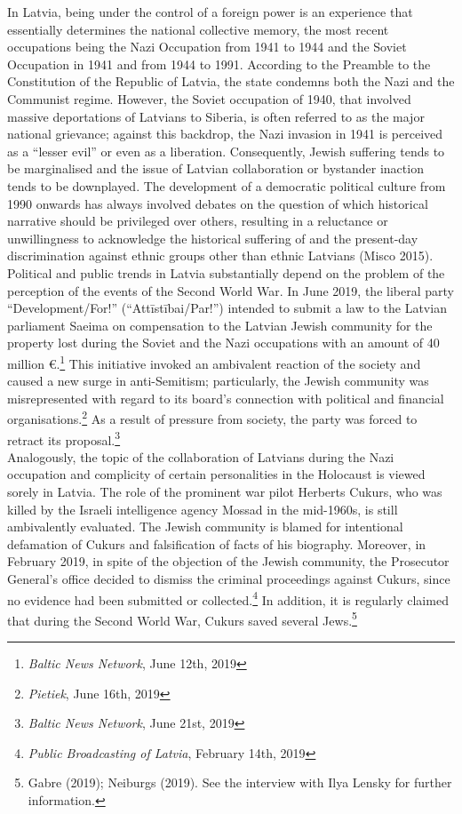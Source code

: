 In Latvia, being under the control of a foreign power is an experience that essentially determines the national collective memory, the most recent occupations being the Nazi Occupation from 1941 to 1944 and the Soviet Occupation in 1941 and from 1944 to 1991. According to the Preamble to the Constitution of the Republic of Latvia, the state condemns both the Nazi and the Communist regime. However, the Soviet occupation of 1940, that involved massive deportations of Latvians to Siberia, is often referred to as the major national grievance; against this backdrop, the Nazi invasion in 1941 is perceived as a “lesser evil” or even as a liberation. Consequently, Jewish suffering tends to be marginalised and the issue of Latvian collaboration or bystander inaction tends to be downplayed. The development of a democratic political culture from 1990 onwards has always involved debates on the question of which historical narrative should be privileged over others, resulting in a reluctance or unwillingness to acknowledge the historical suffering of and the present-day discrimination against ethnic groups other than ethnic Latvians (Misco 2015). \\
Political and public trends in Latvia substantially depend on the problem of the perception of the events of the Second World War. In June 2019, the liberal party ``Development/For!'' (``Attīstībai/Par!'') intended to submit a law to the Latvian parliament Saeima on compensation to the Latvian Jewish community for the property lost during the Soviet and the Nazi occupations with an amount of 40 million \euro{}.\footnote{\textit{Baltic News Network}, June 12th, 2019} This initiative invoked an ambivalent reaction of the society and caused a new surge in anti-Semitism; particularly, the Jewish community was misrepresented with regard to its board’s connection with political and financial organisations.\footnote{\textit{Pietiek}, June 16th, 2019} As a result of pressure from society, the party was forced to retract its proposal.\footnote{\textit{Baltic News Network}, June 21st, 2019}\\  
Analogously, the topic of the collaboration of Latvians during the Nazi occupation and complicity of certain personalities in the Holocaust is viewed sorely in Latvia. The role of the prominent war pilot Herberts Cukurs, who was killed by the Israeli intelligence agency Mossad in the mid-1960s, is still ambivalently evaluated. The Jewish community is blamed for intentional defamation of Cukurs and falsification of facts of his biography. Moreover, in February 2019, in spite of the objection of the Jewish community, the Prosecutor General's office decided to dismiss the criminal proceedings against Cukurs, since no evidence had been submitted or collected.\footnote{\textit{Public Broadcasting of Latvia}, February 14th, 2019} In addition, it is regularly claimed that during the Second World War, Cukurs saved several Jews.\footnote{Gabre (2019); Neiburgs (2019). See the interview with Ilya Lensky for further information.}\\
